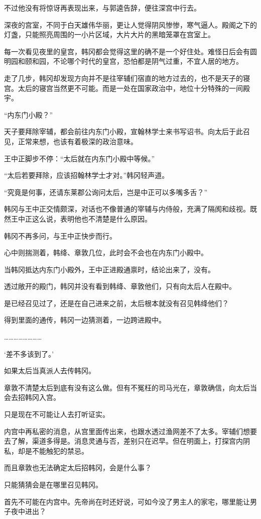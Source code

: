 不过他没有将惊讶再表现出来，与郭逵告辞，便往深宫中行去。

深夜的宫室，不同于白天雄伟华丽，更让人觉得阴风惨惨，寒气逼人。殿阁之下的灯盏，只能照亮周围的一小片区域，大片大片的黑暗笼罩在宫室上。

每一次看见夜里的皇宫，韩冈都会觉得这里的确不是一个好住处。难怪日后会有圆明园和颐和园，不论哪个时代的皇宫，恐怕都是阴气过重，不宜人居的地方。

走了几步，韩冈却发现方向并不是往宰辅们宿直的地方过去的，也不是天子的寝宫。太后的寝宫当然更不可能。而是一处在国家政治中，地位十分特殊的一间殿宇。

“内东门小殿？”

天子要拜除宰辅，都会前往内东门小殿，宣翰林学士来书写诏书。向太后于此召见，正常来想，也该有着极深的政治意味。

王中正脚步不停：“太后就在内东门小殿中等候。”

“太后若要拜除，应该招翰林学士才对。”韩冈轻声道。

“究竟是何事，还请东莱郡公询问太后，岂是中正可以多嘴多舌？”

韩冈与王中正交情颇深，对话也不像普通的宰辅与内侍般，充满了隔阂和歧视。既然王中正这么说，表明他也不清楚是什么原因。

韩冈不再多问，与王中正快步而行。

心中则揣测着，韩绛、章敦几位，此时会不会也在内东门小殿中。

当韩冈抵达内东门小殿外，王中正进殿通禀时，结论出来了，没有。

透过敞开的殿门，韩冈并没有看到韩绛、章敦他们，只有向太后人在殿中。

是已经召见过了，还是在自己进来之前，太后根本就没有召见韩绛他们？

得到里面的通传，韩冈一边猜测着，一边跨进殿中。

……………………

‘差不多该到了。’

如果太后当真派人去传韩冈。

章敦不清楚太后到底有没有这么做。但有不冤枉的司马光在，章敦确信，向太后当会去招韩冈入宫。

只是现在不可能让人去打听证实。

内宫中再私密的消息，从宫里面传出来，也跟水透过渔网差不了太多。宰辅们想要去了解，渠道多得是。消息灵通与否，差别只在迟早。但在明面上，打探宫内阴私，却是不能触犯的禁忌。

而且章敦也无法确定太后招韩冈，会是什么事？

只能猜猜会是在哪里召见韩冈。

首先不可能在内宫中。先帝尚在时还好说，可如今没了男主人的家宅，哪里能让男子夜中进出？

